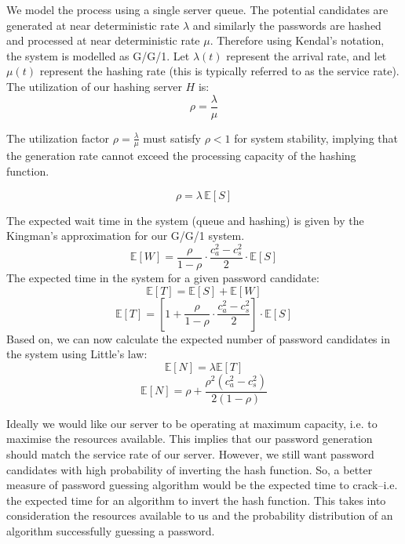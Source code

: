 We model the process using a single server queue. The potential candidates are generated at near deterministic rate $\lambda$ and similarly the passwords are hashed and processed at near deterministic rate $\mu$. Therefore using Kendal's notation, the system is modelled as G/G/1. Let $\lambda(t)$ represent the arrival rate, and let $\mu(t)$ represent the hashing rate (this is typically referred to as the service rate). The utilization of our hashing server $H$ is:
\begin{equation}
    \rho = \frac{\lambda}{\mu}
\end{equation}

The utilization factor $\rho = \frac{\lambda}{\mu}$ must satisfy $\rho < 1$ for system stability, implying that the generation rate cannot exceed the processing capacity of the hashing function. 

\[
\rho = \lambda \, \mathbb{E}[S]
\]

The expected wait time in the system (queue and hashing) is given by the Kingman's approximation for our G/G/1 system.
\begin{equation}
    \mathbb{E}[W] = \frac{\rho}{1 - \rho} \cdot \frac{c_a^2 - c_s^2}{2} \cdot \mathbb{E}[S]
\end{equation}
The expected time in the system for a given password candidate:
\begin{equation}
    \mathbb{E}[T] = \mathbb{E}[S] + \mathbb{E}[W]
\end{equation}
\begin{equation}
    \mathbb{E}[T] = \left[ 1 + \frac{\rho}{1 - \rho} \cdot \frac{c_a^2 - c_s^2}{2} \right] \cdot \mathbb{E}[S]
\end{equation}
Based on, we can now calculate the expected number of password candidates in the system using Little's law:
\begin{equation}
    \mathbb{E}[N] = \lambda \mathbb{E}[T]
\end{equation}
\begin{equation}
    \mathbb{E}[N] = \rho + \frac{\rho^2(c_a^2 - c_s^2)}{2(1 - \rho)}
\end{equation}

Ideally we would like our server to be operating at maximum capacity, i.e. to maximise the resources available. This implies that our password generation should match the service rate of our server. However, we still want password candidates with high probability of inverting the hash function. So, a better measure of password guessing algorithm would be the expected time to crack--i.e. the expected time for an algorithm to invert the hash function. This takes into consideration the resources available to us and the probability distribution of an algorithm successfully guessing a password.
